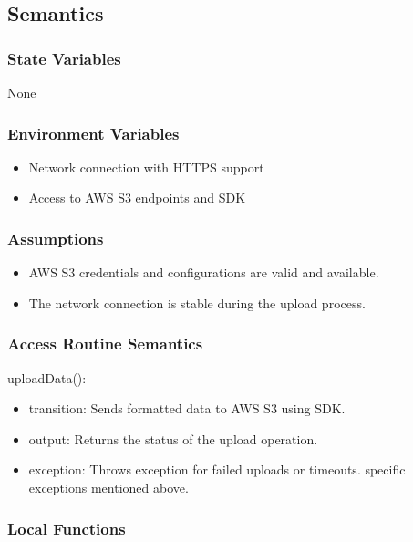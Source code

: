 \documentclass[12pt, titlepage]{article}
\begin{document}
\subsection{Semantics}

\subsubsection{State Variables}

None

\subsubsection{Environment Variables}

\begin{itemize}
  \item Network connection with HTTPS support
  \item Access to AWS S3 endpoints and SDK
\end{itemize}

\subsubsection{Assumptions}

\begin{itemize}
  \item AWS S3 credentials and configurations are valid and available.
  \item The network connection is stable during the upload process.
\end{itemize}

\subsubsection{Access Routine Semantics}

\noindent uploadData():
\begin{itemize}
\item transition: Sends formatted data to AWS S3 using SDK.
\item output: Returns the status of the upload operation.
\item exception: Throws exception for failed uploads or timeouts. specific exceptions mentioned above.
\end{itemize}

\subsubsection{Local Functions}
\end{document}
